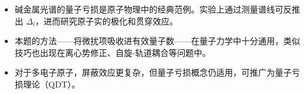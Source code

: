 \begin{insightbox}[物理图像]
\begin{itemize}
    \item 碱金属光谱的量子亏损是原子物理中的经典范例。实验上通过测量谱线可反推出 $\Delta_l$，进而研究原子实的极化和贯穿效应。
    \item 本题的方法——将微扰项吸收进有效量子数——在量子力学中十分通用，类似技巧也出现在离心势修正、自旋-轨道耦合等问题中。
    \item 对于多电子原子，屏蔽效应更复杂，但量子亏损概念仍适用，可推广为量子亏损理论（QDT）。
\end{itemize}
\end{insightbox}
